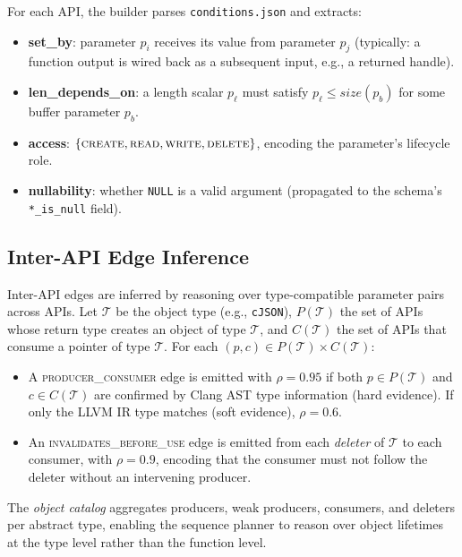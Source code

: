 \documentclass[sigconf,anonymous]{acmart}
\begin{document}
For each API, the builder parses \texttt{conditions.json} and extracts:

\begin{itemize}
  \item \textbf{set\_by}: parameter $p_i$ receives its value from parameter
    $p_j$ (typically: a function output is wired back as a subsequent
    input, e.g., a returned handle).
  \item \textbf{len\_depends\_on}: a length scalar $p_\ell$ must satisfy
    $p_\ell \leq \textit{size}(p_b)$ for some buffer parameter $p_b$.
  \item \textbf{access}: $\{\textsc{create}, \textsc{read},
    \textsc{write}, \textsc{delete}\}$, encoding the parameter's
    lifecycle role.
  \item \textbf{nullability}: whether \texttt{NULL} is a valid argument
    (propagated to the schema's \texttt{*\_is\_null} field).
\end{itemize}

\subsection{Inter-API Edge Inference}

Inter-API edges are inferred by reasoning over type-compatible parameter
pairs across APIs.  Let $\mathcal{T}$ be the object type (e.g., \texttt{cJSON}),
$P(\mathcal{T})$ the set of APIs whose return type creates an object of
type $\mathcal{T}$, and $C(\mathcal{T})$ the set of APIs that consume
a pointer of type $\mathcal{T}$.  For each $(p, c) \in P(\mathcal{T}) \times C(\mathcal{T})$:

\begin{itemize}
  \item A \textsc{producer\_consumer} edge is emitted with
    $\rho = 0.95$ if both $p \in P(\mathcal{T})$ and $c \in C(\mathcal{T})$
    are confirmed by Clang AST type information (hard evidence).
    If only the LLVM IR type matches (soft evidence), $\rho = 0.6$.
  \item An \textsc{invalidates\_before\_use} edge is emitted from each
    \textit{deleter} of $\mathcal{T}$ to each consumer, with $\rho = 0.9$,
    encoding that the consumer must not follow the deleter without an
    intervening producer.
\end{itemize}

The \emph{object catalog} aggregates producers, weak producers, consumers,
and deleters per abstract type, enabling the sequence planner to reason
over object lifetimes at the type level rather than the function level.
\end{document}
